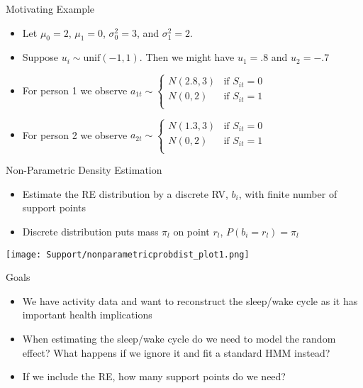 \documentclass{beamer}
\begin{document}
\begin{frame}{Motivating Example}
\begin{itemize}
    \item Let $\mu_0 = 2$, $\mu_1 = 0$, $\sigma_0^2 = 3$,  and $\sigma_1^2 = 2$.
    \item Suppose $u_i \sim \text{unif}(-1,1)$. Then we might have $u_1 = .8$ and $u_2 = -.7$ 
    \bigskip
    \item For person 1 we observe $a_{1t}  \sim \begin{cases}
                    N(2.8,3)  & \text{if } S_{it}=0 \\ 
                    N(0,2)  & \text{if } S_{it}=1 \\ 
    \end{cases}$
    \bigskip
    \item For person 2 we observe $a_{2t}  \sim \begin{cases}
                    N(1.3,3)  & \text{if } S_{it}=0 \\ 
                    N(0,2)  & \text{if } S_{it}=1 \\ 
    \end{cases}$
\end{itemize}

\end{frame}

\begin{frame}{Non-Parametric Density Estimation}
\begin{itemize}
    \item Estimate the RE distribution by a discrete RV, $b_i$, with finite number of support points
    \item Discrete distribution puts mass $\pi_l$ on point $r_l$, $P(b_i = r_l) = \pi_l$
\end{itemize}

\centering
\texttt{[image: Support/nonparametricprobdist\_plot1.png]}

\end{frame}

\begin{frame}{Goals}
\begin{itemize}
    \item We have activity data and want to reconstruct the sleep/wake cycle as it has important health implications
    \item When estimating the sleep/wake cycle do we need to model the random effect? What happens if we ignore it and fit a standard HMM instead?
    \item If we include the RE, how many support points do we need? 
\end{itemize}

\end{frame}
\end{document}

